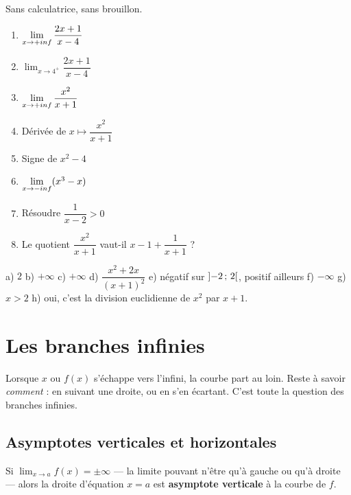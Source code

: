 \begin{automatismes}
Sans calculatrice, sans brouillon.

\begin{enumerate}[label=\textbf{\alph*)}, leftmargin=*, itemsep=0.25em]
  \item $\limpinf \dfrac{2x+1}{x-4}$
  \item $\displaystyle\lim_{x \to 4^{+}} \dfrac{2x+1}{x-4}$
  \item $\limpinf \dfrac{x^{2}}{x+1}$
  \item Dérivée de $x \mapsto \dfrac{x^{2}}{x+1}$
  \item Signe de $x^{2}-4$
  \item $\limminf (x^{3}-x)$
  \item Résoudre $\dfrac{1}{x-2} > 0$
  \item Le quotient $\dfrac{x^{2}}{x+1}$ vaut-il $x-1+\dfrac{1}{x+1}$ ?
\end{enumerate}
\end{automatismes}

\begin{corrige}[automatismes]
a) $2$ \quad b) $+\infty$ \quad c) $+\infty$ \quad
d) $\dfrac{x^{2}+2x}{(x+1)^{2}}$ \quad e) négatif sur $\left]-2\,;\,2\right[$,
positif ailleurs \quad f) $-\infty$ \quad g) $x > 2$ \quad
h) oui, c'est la division euclidienne de $x^{2}$ par $x+1$.
\end{corrige}

\section{Les branches infinies}

Lorsque $x$ ou $f(x)$ s'échappe vers l'infini, la courbe part au loin. Reste à
savoir \emph{comment} : en suivant une droite, ou en s'en écartant. C'est toute
la question des branches infinies.

\subsection{Asymptotes verticales et horizontales}

\begin{definition}
Si $\displaystyle\lim_{x \to a} f(x) = \pm\infty$ — la limite pouvant n'être
qu'à gauche ou qu'à droite — alors la droite d'équation $x = a$ est
\textbf{asymptote verticale} à la courbe de $f$.
\end{definition}

